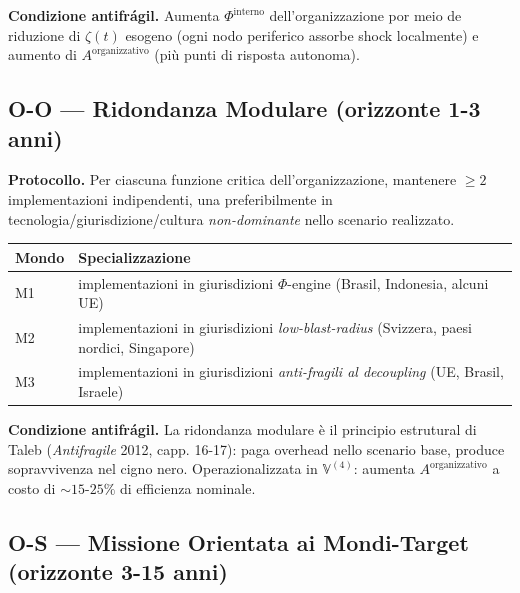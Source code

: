 \Proved{} \textbf{Condizione antifrágil.} Aumenta
\(\Phi^{\text{interno}}\) dell'organizzazione por meio de riduzione di
\(\zeta(t)\) esogeno (ogni nodo periferico assorbe shock localmente) e
aumento di \(A^{\text{organizzativo}}\) (più punti di risposta
autonoma).

\subsection{O-O --- Ridondanza Modulare (orizzonte 1-3
anni)}\label{o-o-ridondanza-modulare-orizzonte-1-3-anni}

\Hypoth{} \textbf{Protocollo.} Per ciascuna funzione critica
dell'organizzazione, mantenere \(\geq 2\) implementazioni indipendenti,
una preferibilmente in tecnologia/giurisdizione/cultura
\emph{non-dominante} nello scenario realizzato.

{\def\LTcaptype{none} %
{\small\begin{longtable}[]{@{}
  >{\raggedright\arraybackslash}p{}
  >{\raggedright\arraybackslash}p{}@{}}
\toprule\noalign{}
\begin{minipage}[b]{\linewidth}\raggedright
Mondo
\end{minipage} & \begin{minipage}[b]{\linewidth}\raggedright
Specializzazione
\end{minipage} \\
\midrule\noalign{}
\endhead
\bottomrule\noalign{}
\endlastfoot
M1 & implementazioni in giurisdizioni \(\Phi\)-engine (Brasil,
Indonesia, alcuni UE) \\
M2 & implementazioni in giurisdizioni \emph{low-blast-radius} (Svizzera,
paesi nordici, Singapore) \\
M3 & implementazioni in giurisdizioni \emph{anti-fragili al decoupling}
(UE, Brasil, Israele) \\
\end{longtable}}
}

\Proved{} \textbf{Condizione antifrágil.} La ridondanza modulare è il
principio estrutural di Taleb (\emph{Antifragile} 2012, capp. 16-17):
paga overhead nello scenario base, produce sopravvivenza nel cigno nero.
Operazionalizzata in \(\mathbb{V}^{(4)}\): aumenta
\(A^{\text{organizzativo}}\) a costo di \(\sim 15\)-\(25\%\) di
efficienza nominale.

\subsection{O-S --- Missione Orientata ai Mondi-Target (orizzonte 3-15
anni)}\label{o-s-missione-orientata-ai-mondi-target-orizzonte-3-15-anni}

